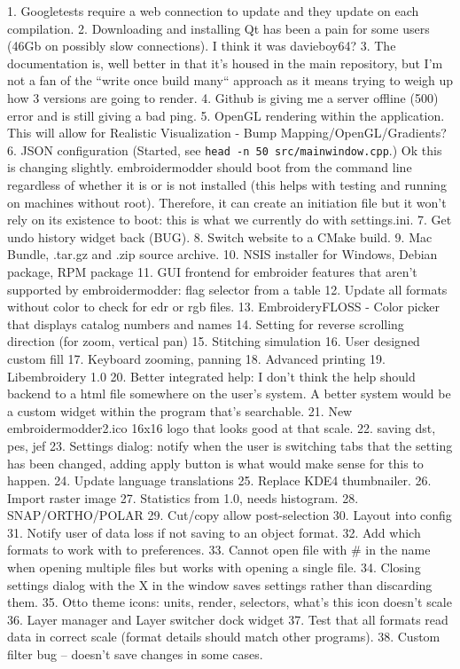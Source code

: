 1. Googletests require a web connection to update and they update on each compilation.
2. Downloading and installing Qt has been a pain for some users (46Gb on possibly slow connections). I think it was davieboy64?
3. The documentation is, well better in that it's housed in the main repository, but I'm not a fan of the ``write once build many`` approach as it means trying to weigh up how 3 versions are going to render.
4. Github is giving me a server offline (500) error and is still giving a bad ping.
5. OpenGL rendering within the application. This will allow for Realistic Visualization - Bump Mapping/OpenGL/Gradients?
6. JSON configuration (Started, see \texttt{head -n 50 src/mainwindow.cpp}.) Ok this is changing slightly. embroidermodder should boot from the command line regardless of whether it is or is not installed (this helps with testing and running on machines without root). Therefore, it can create an initiation file but it won't rely on its existence to boot: this is what we currently do with settings.ini.
7. Get undo history widget back (BUG).
8. Switch website to a CMake build.
9. Mac Bundle, .tar.gz and .zip source archive.
10. NSIS installer for Windows, Debian package, RPM package
11. GUI frontend for embroider features that aren't supported by embroidermodder: flag selector from a table
12. Update all formats without color to check for edr or rgb files.
13. EmbroideryFLOSS - Color picker that displays catalog numbers and names
14. Setting for reverse scrolling direction (for zoom, vertical pan)
15. Stitching simulation
16. User designed custom fill
17. Keyboard zooming, panning
18. Advanced printing
19. Libembroidery 1.0
20. Better integrated help: I don't think the help should backend to a html file somewhere on the user's system. A better system would be a custom widget within the program that's searchable.
21. New embroidermodder2.ico 16x16 logo that looks good at that scale.
22. saving dst, pes, jef
23. Settings dialog: notify when the user is switching tabs that the setting has been changed, adding apply button is what would make sense for this to happen.
24. Update language translations
25. Replace KDE4 thumbnailer.
26. Import raster image
27. Statistics from 1.0, needs histogram.
28. SNAP/ORTHO/POLAR
29. Cut/copy allow post-selection
30. Layout into config
31. Notify user of data loss if not saving to an object format.
32. Add which formats to work with to preferences.
33. Cannot open file with \# in the name when opening multiple files but works with opening a single file.
34. Closing settings dialog with the X in the window saves settings rather than discarding them.
35. Otto theme icons: units, render, selectors, what's this icon doesn't  scale
36. Layer manager and Layer switcher dock widget
37. Test that all formats read data in correct scale (format details should match other programs).
38. Custom filter bug -- doesn't save changes in some cases.

